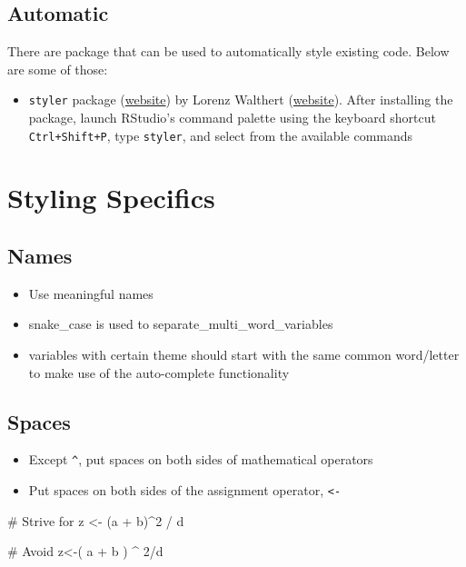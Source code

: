 \documentclass[
  letterpaper,
  DIV=11,
  numbers=noendperiod]{scrreprt}
\newenvironment{Shaded}{\begin{snugshade}}{\end{snugshade}}
\newcommand{\CommentTok}[1]{\textcolor[rgb]{0.37,0.37,0.37}{#1}}
\newcommand{\DecValTok}[1]{\textcolor[rgb]{0.68,0.00,0.00}{#1}}
\newcommand{\NormalTok}[1]{\textcolor[rgb]{0.00,0.23,0.31}{#1}}
\newcommand{\OtherTok}[1]{\textcolor[rgb]{0.00,0.23,0.31}{#1}}
\newcommand{\SpecialCharTok}[1]{\textcolor[rgb]{0.37,0.37,0.37}{#1}}
\providecommand{\tightlist}{%
  \setlength{\itemsep}{0pt}\setlength{\parskip}{0pt}}\usepackage{longtable,booktabs,array}
\begin{document}
\subsection{Automatic}\label{automatic}

There are package that can be used to automatically style existing code.
Below are some of those:

\begin{itemize}
\tightlist
\item
  \texttt{styler} package (\href{https://styler.r-lib.org/}{website}) by
  Lorenz Walthert (\href{https://lorenzwalthert.com/}{website}). After
  installing the package, launch RStudio's command palette using the
  keyboard shortcut \texttt{Ctrl+Shift+P}, type \texttt{styler}, and
  select from the available commands
\end{itemize}

\section{Styling Specifics}\label{styling-specifics}

\subsection{Names}\label{names}

\begin{itemize}
\tightlist
\item
  Use meaningful names
\item
  snake\_case is used to separate\_multi\_word\_variables
\item
  variables with certain theme should start with the same common
  word/letter to make use of the auto-complete functionality
\end{itemize}

\subsection{Spaces}\label{spaces}

\begin{itemize}
\tightlist
\item
  Except \texttt{\^{}}, put spaces on both sides of mathematical
  operators
\item
  Put spaces on both sides of the assignment operator,
  \texttt{\textless{}-}
\end{itemize}

\begin{Shaded}
\begin{Highlighting}[]
\CommentTok{\# Strive for}
\NormalTok{z }\OtherTok{\textless{}{-}}\NormalTok{ (a }\SpecialCharTok{+}\NormalTok{ b)}\SpecialCharTok{\^{}}\DecValTok{2} \SpecialCharTok{/}\NormalTok{ d}

\CommentTok{\# Avoid}
\NormalTok{z}\OtherTok{\textless{}{-}}\NormalTok{( a }\SpecialCharTok{+}\NormalTok{ b ) }\SpecialCharTok{\^{}} \DecValTok{2}\SpecialCharTok{/}\NormalTok{d}
\end{Highlighting}
\end{Shaded}
\end{document}
